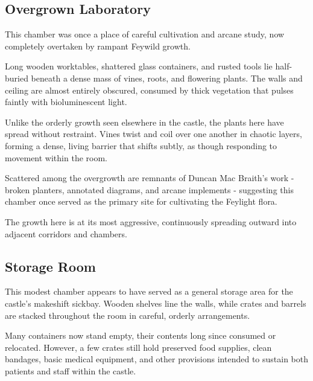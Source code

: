 \subsection*{ Overgrown Laboratory}\label{sec:OvergrownLaboratory}
{\entryfont This chamber was once a place of careful cultivation and arcane study, now completely overtaken by rampant Feywild growth.

Long wooden worktables, shattered glass containers, and rusted tools lie half-buried beneath a dense mass of vines, roots, and flowering plants. The walls and ceiling are almost entirely obscured, consumed by thick vegetation that pulses faintly with bioluminescent light.

Unlike the orderly growth seen elsewhere in the castle, the plants here have spread without restraint. Vines twist and coil over one another in chaotic layers, forming a dense, living barrier that shifts subtly, as though responding to movement within the room.

Scattered among the overgrowth are remnants of Duncan Mac Braith's work - broken planters, annotated diagrams, and arcane implements - suggesting this chamber once served as the primary site for cultivating the Feylight flora.

The growth here is at its most aggressive, continuously spreading outward into adjacent corridors and chambers.}
\subsection*{ Storage Room}
{\entryfont This modest chamber appears to have served as a general storage area for the castle's makeshift sickbay. Wooden shelves line the walls, while crates and barrels are stacked throughout the room in careful, orderly arrangements.

Many containers now stand empty, their contents long since consumed or relocated. However, a few crates still hold preserved food supplies, clean bandages, basic medical equipment, and other provisions intended to sustain both patients and staff within the castle.}
